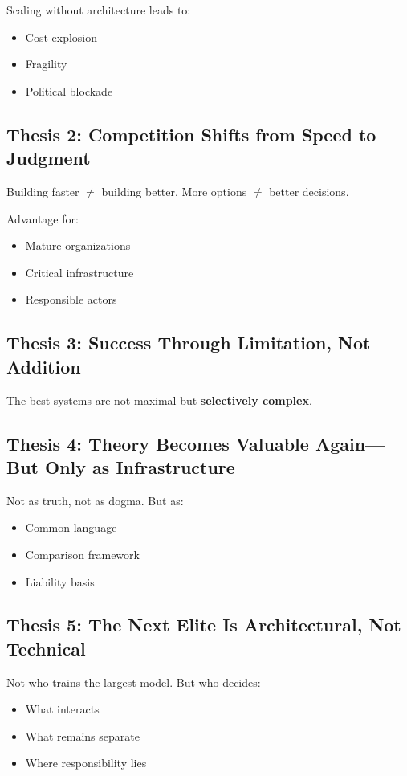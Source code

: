 Scaling without architecture leads to:
\begin{itemize}[nosep]
    \item Cost explosion
    \item Fragility
    \item Political blockade
\end{itemize}

\subsection{Thesis 2: Competition Shifts from Speed to Judgment}

Building faster $\neq$ building better. More options $\neq$ better decisions.

Advantage for:
\begin{itemize}[nosep]
    \item Mature organizations
    \item Critical infrastructure
    \item Responsible actors
\end{itemize}

\subsection{Thesis 3: Success Through Limitation, Not Addition}

The best systems are not maximal but \textbf{selectively complex}.

\subsection{Thesis 4: Theory Becomes Valuable Again---But Only as Infrastructure}

Not as truth, not as dogma. But as:
\begin{itemize}[nosep]
    \item Common language
    \item Comparison framework
    \item Liability basis
\end{itemize}

\subsection{Thesis 5: The Next Elite Is Architectural, Not Technical}

Not who trains the largest model. But who decides:
\begin{itemize}[nosep]
    \item What interacts
    \item What remains separate
    \item Where responsibility lies
\end{itemize}

